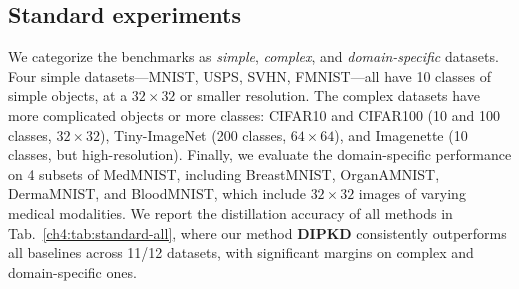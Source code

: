 \subsection{Standard experiments} \label{ch4:ssec:04-experiments-standard}
\begin{foldable}
    We categorize the benchmarks as \textit{simple}, \textit{complex}, and \textit{domain-specific} datasets.
    Four simple datasets---MNIST, USPS, SVHN, FMNIST---all have 10 classes of simple objects, at a $32\times32$ or smaller resolution.
    The complex datasets have more complicated objects or more classes: CIFAR10 and CIFAR100 (10 and 100 classes, $32\times32$), Tiny-ImageNet (200 classes, $64\times64$), and Imagenette (10 classes, but high-resolution).
    Finally, we evaluate the domain-specific performance on 4 subsets of MedMNIST, including BreastMNIST, OrganAMNIST, DermaMNIST, and BloodMNIST, which include $32\times32$ images of varying medical modalities.
    We report the distillation accuracy of all methods in Tab.~\ref{ch4:tab:standard-all}, where our method \textbf{DIPKD} consistently outperforms all baselines across 11/12 datasets, with significant margins on complex and domain-specific ones.
\end{foldable}

